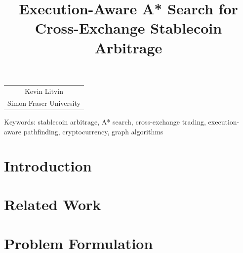 \documentclass[10pt]{cai26}
\begin{document}
\def\conferenceyear{2026}
\def\paperID{306}
\begin{center}

\title{Execution-Aware A* Search for Cross-Exchange Stablecoin Arbitrage}
\maketitle

\thispagestyle{empty}

\begin{tabular}{c}
Kevin Litvin\\
Simon Fraser University\\
\end{tabular}
\vspace*{0.1in}
\end{center}



\begin{keywords}{Keywords:}
stablecoin arbitrage, A* search, cross-exchange trading, execution-aware pathfinding, cryptocurrency, graph algorithms
\end{keywords}

\section{Introduction}


\section{Related Work}


\section{Problem Formulation}

\end{document}
